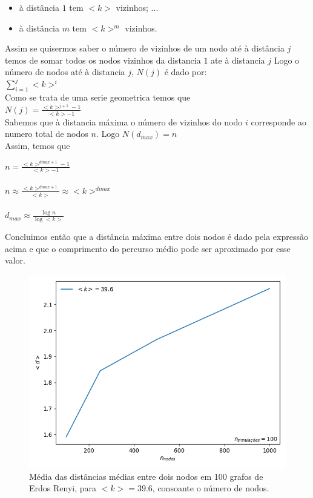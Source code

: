 \documentclass[conference, twocolumn]{IEEEtran}
\theoremstyle{plain}
\theoremstyle{definition}
\theoremstyle{remark}
\begin{document}
\begin{itemize}
    \item à distância $1$ tem $<k>$ vizinhos;
    ...
    \item à distância $m$ tem $<k>^m$ vizinhos.
\end{itemize}

Assim se quisermos saber o número de vizinhos de um nodo até à distância $j$ temos de somar todos os nodos vizinhos da distancia $1$ ate à distancia $j$
Logo o número de nodos até à distancia $j$, $N(j)$ é dado por:\\

$\sum_{i=1}^{j} <k>^i$ \\

Como se trata de uma serie geometrica temos que\\

$N(j)= \frac{<k>^{j+1}-1}{<k>-1}$\\

Sabemos que à distancia máxima o número de vizinhos do nodo $i$ corresponde ao numero total de nodos $n$. Logo $N(d_{max})=n$\\

Assim, temos que \\
\begin{center}
$n = \frac{<k>^{dmax+1}-1}{<k>-1}$\\
${}$\\
$n \approx \frac{<k>^{dmax+1}}{<k>} \approx <k>^{dmax}$\\
${}$\\
$d_{max} \approx \frac{\log n}{\log <k>}$
\end{center}

Concluimos então que a distância máxima entre dois nodos é dado pela expressão acima e que o comprimento do percurso médio pode ser aproximado por esse valor.\\

\begin{figure}[h]
    \centering
    \includegraphics[width=1\linewidth]{images/erdos_renyi_average_path_length.png}
    \caption{\small Média das distâncias médias entre dois nodos em 100 grafos de Erdos  Renyi, para $<k> = 39.6$, consoante o número de nodos.}
    \label{fig:erdos_renyi_average_path_length}
\end{figure}
\end{document}
